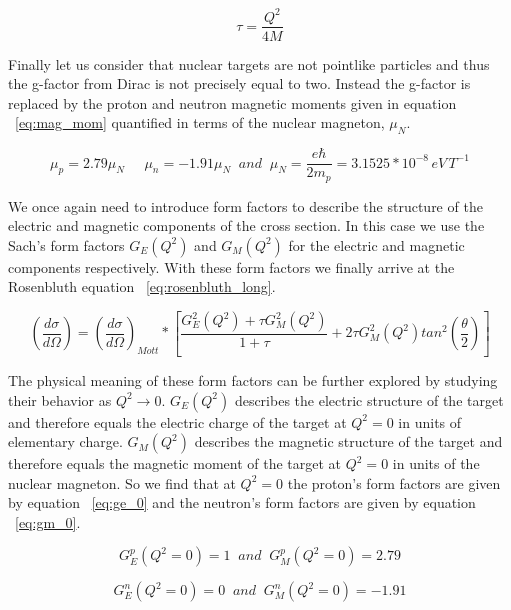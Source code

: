 \begin{equation} \label{eq:tau}
\tau = \frac{Q^2}{4M}
\end{equation}

Finally let us consider that nuclear targets are not pointlike particles and thus the g-factor from Dirac is not precisely equal to two. Instead the g-factor is replaced by the proton and neutron magnetic moments given in equation ~\ref{eq:mag_mom} quantified in terms of the nuclear magneton, $\mu_N$.

 \begin{equation} \label{eq:mag_mom}
\mu_p = 2.79 \mu_N \;\;\;\;\; \mu_n = -1.91 \mu_N \;\; and \;\; \mu_N = \frac{e\hbar}{2m_p} = 3.1525 * 10^{-8} \, eV \, T^{-1}
\end{equation}

\noindent We once again need to introduce form factors to describe the structure of the electric and magnetic components of the cross section. In this case we use the Sach's form factors $G_E(Q^2)$ and $G_M(Q^2)$ for the electric and magnetic components respectively. With these form factors we finally arrive at the Rosenbluth equation ~\ref{eq:rosenbluth_long}.

\begin{equation} \label{eq:rosenbluth_long}
\left(\frac{d\sigma}{d\Omega}\right) = \left( \frac{d\sigma}{d\Omega} \right)_{Mott} * \left[ \frac{G_E^2\left(Q^2\right)+\tau G_M^2\left(Q^2\right)}{1+\tau} + 2 \tau G_M^2\left(Q^2\right) tan^2\left( \frac{\theta}{2} \right) \right]
\end{equation}

The physical meaning of these form factors can be further explored by studying their behavior as $Q^2 \rightarrow 0$. $G_E(Q^2)$ describes the electric structure of the target and therefore equals the electric charge of the target at $Q^2 = 0$ in units of elementary charge. $G_M(Q^2)$ describes the magnetic structure of the target and therefore equals the magnetic moment of the target at $Q^2 = 0$ in units of the nuclear magneton. So we find that at $Q^2 = 0$ the proton's form factors are given by equation ~\ref{eq:ge_0} and the neutron's form factors are given by equation ~\ref{eq:gm_0}.

\begin{equation} \label{eq:ge_0}
	G_E^p\left(Q^2=0\right) = 1 \;\; and \;\; G_M^p\left(Q^2=0\right) = 2.79
\end{equation}

\begin{equation} \label{eq:gm_0}
	G_E^n\left(Q^2=0\right) = 0 \;\; and \;\; G_M^n\left(Q^2=0\right) = -1.91
\end{equation}

